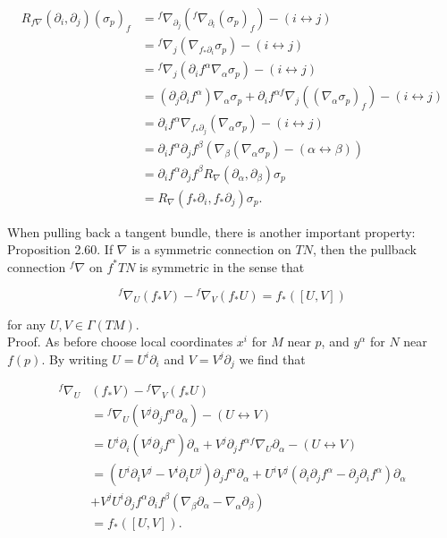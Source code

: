 \documentclass[10pt, letterpaper]{article}
\begin{document}
$$
\begin{aligned}
R_{f \nabla}\left(\partial_{i}, \partial_{j}\right)\left(\sigma_{p}\right)_{f} & ={ }^{f} \nabla_{\partial_{j}}\left({ }^{f} \nabla_{\partial_{i}}\left(\sigma_{p}\right)_{f}\right)-(i \leftrightarrow j) \\
& ={ }^{f} \nabla_{j}\left(\nabla_{f_{*} \partial_{i}} \sigma_{p}\right)-(i \leftrightarrow j) \\
& ={ }^{f} \nabla_{j}\left(\partial_{i} f^{\alpha} \nabla_{\alpha} \sigma_{p}\right)-(i \leftrightarrow j) \\
& =\left(\partial_{j} \partial_{i} f^{\alpha}\right) \nabla_{\alpha} \sigma_{p}+\partial_{i} f^{\alpha f} \nabla_{j}\left(\left(\nabla_{\alpha} \sigma_{p}\right)_{f}\right)-(i \leftrightarrow j) \\
& =\partial_{i} f^{\alpha} \nabla_{f_{*} \partial_{j}}\left(\nabla_{\alpha} \sigma_{p}\right)-(i \leftrightarrow j) \\
& =\partial_{i} f^{\alpha} \partial_{j} f^{\beta}\left(\nabla_{\beta}\left(\nabla_{\alpha} \sigma_{p}\right)-(\alpha \leftrightarrow \beta)\right) \\
& =\partial_{i} f^{\alpha} \partial_{j} f^{\beta} R_{\nabla}\left(\partial_{\alpha}, \partial_{\beta}\right) \sigma_{p} \\
& =R_{\nabla}\left(f_{*} \partial_{i}, f_{*} \partial_{j}\right) \sigma_{p} .
\end{aligned}
$$

When pulling back a tangent bundle, there is another important property:\\
Proposition 2.60. If $\nabla$ is a symmetric connection on $T N$, then the pullback connection ${ }^{f} \nabla$ on $f^{*} T N$ is symmetric in the sense that

$$
{ }^{f} \nabla_{U}\left(f_{*} V\right)-{ }^{f} \nabla_{V}\left(f_{*} U\right)=f_{*}([U, V])
$$

for any $U, V \in \Gamma(T M)$.\\
Proof. As before choose local coordinates $x^{i}$ for $M$ near $p$, and $y^{\alpha}$ for $N$ near $f(p)$. By writing $U=U^{i} \partial_{i}$ and $V=V^{j} \partial_{j}$ we find that

$$
\begin{aligned}
{ }^{f} \nabla_{U} & \left(f_{*} V\right)-{ }^{f} \nabla_{V}\left(f_{*} U\right) \\
& ={ }^{f} \nabla_{U}\left(V^{j} \partial_{j} f^{\alpha} \partial_{\alpha}\right)-(U \leftrightarrow V) \\
& =U^{i} \partial_{i}\left(V^{j} \partial_{j} f^{\alpha}\right) \partial_{\alpha}+V^{j} \partial_{j} f^{\alpha}{ }^{f} \nabla_{U} \partial_{\alpha}-(U \leftrightarrow V) \\
& =\left(U^{i} \partial_{i} V^{j}-V^{i} \partial_{i} U^{j}\right) \partial_{j} f^{\alpha} \partial_{\alpha}+U^{i} V^{j}\left(\partial_{i} \partial_{j} f^{\alpha}-\partial_{j} \partial_{i} f^{\alpha}\right) \partial_{\alpha} \\
& +V^{j} U^{i} \partial_{j} f^{\alpha} \partial_{i} f^{\beta}\left(\nabla_{\beta} \partial_{\alpha}-\nabla_{\alpha} \partial_{\beta}\right) \\
& =f_{*}([U, V]) .
\end{aligned}
$$
\end{document}
